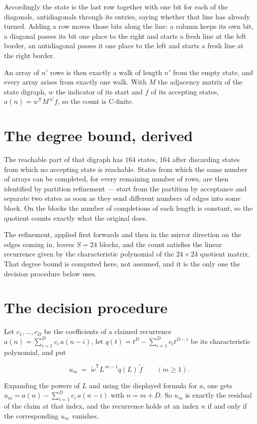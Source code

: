 \documentclass[11pt]{article}
\theoremstyle{definition}
\begin{document}
Accordingly the state is the last row together with one bit for each of the diagonals, antidiagonals through its entries, saying whether that line has already turned. Adding a row moves those bits along the line: a column keeps its own bit, a diagonal passes its bit one place to the right and starts a fresh line at the left border, an antidiagonal passes it one place to the left and starts a fresh line at the right border.

An array of $n'$ rows is then exactly a walk of length $n'$ from the empty state, and every array arises from exactly one walk. With $M$ the adjacency matrix of the state digraph, $w$ the indicator of its start and $f$ of its accepting states, $a(n) = w^{\mathsf T}M^{\,n'}f$, so the count is C-finite.

\section{The degree bound, derived}

The reachable part of that digraph has $164$ states, $164$ after discarding states from which no accepting state is reachable. States from which the same number of arrays can be completed, for every remaining number of rows, are then identified by partition refinement --- start from the partition by acceptance and separate two states as soon as they send different numbers of edges into some block. On the blocks the number of completions of each length is constant, so the quotient counts exactly what the original does.

The refinement, applied first forwards and then in the mirror direction on the edges coming in, leaves $S = 24$ blocks, and the count satisfies the linear recurrence given by the characteristic polynomial of the $24 \times 24$ quotient matrix. That degree bound is computed here, not assumed, and it is the only one the decision procedure below uses.

\section{The decision procedure}

Let $c_1,\dots,c_D$ be the coefficients of a claimed recurrence $a(n) = \sum_{i=1}^{D} c_i\,a(n-i)$, let $q(t) = t^{D} - \sum_{i=1}^{D} c_i t^{D-i}$ be its characteristic polynomial, and put

\[u_m \;=\; \tilde w^{\mathsf T} L^{\,m-1} q(L)\,\tilde f \qquad (m \ge 1).\]

Expanding the powers of $L$ and using the displayed formula for $a$, one gets $u_m = a(n) - \sum_{i=1}^{D} c_i\,a(n-i)$ with $n = m + D$. So $u_m$ is exactly the residual of the claim at that index, and the recurrence holds at an index $n$ if and only if the corresponding $u_m$ vanishes.
\end{document}
